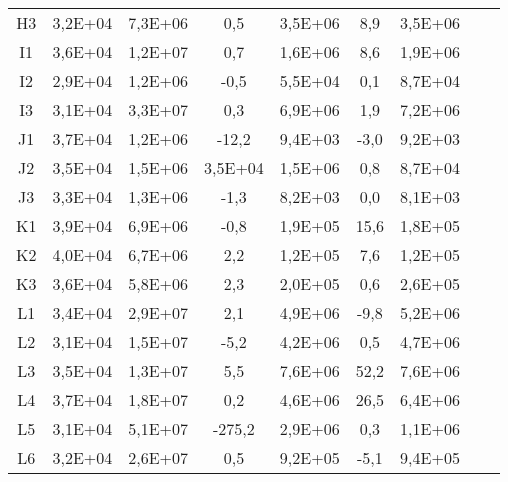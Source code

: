 \begin{center}
\begin{longtable}{ccccccccc}
H3    & 3,2E+04 & 7,3E+06 & 0,5   & 3,5E+06 & 8,9   & 3,5E+06 \\
I1    & 3,6E+04 & 1,2E+07 & 0,7   & 1,6E+06 & 8,6   & 1,9E+06 \\
I2    & 2,9E+04 & 1,2E+06 & -0,5  & 5,5E+04 & 0,1   & 8,7E+04 \\
I3    & 3,1E+04 & 3,3E+07 & 0,3   & 6,9E+06 & 1,9   & 7,2E+06 \\
J1    & 3,7E+04 & 1,2E+06 & -12,2 & 9,4E+03 & -3,0  & 9,2E+03 \\
J2    & 3,5E+04 & 1,5E+06 & 3,5E+04 & 1,5E+06 & 0,8   & 8,7E+04 \\
J3    & 3,3E+04 & 1,3E+06 & -1,3  & 8,2E+03 & 0,0   & 8,1E+03 \\
K1    & 3,9E+04 & 6,9E+06 & -0,8  & 1,9E+05 & 15,6  & 1,8E+05 \\
K2    & 4,0E+04 & 6,7E+06 & 2,2   & 1,2E+05 & 7,6   & 1,2E+05 \\
K3    & 3,6E+04 & 5,8E+06 & 2,3   & 2,0E+05 & 0,6   & 2,6E+05 \\
L1    & 3,4E+04 & 2,9E+07 & 2,1   & 4,9E+06 & -9,8  & 5,2E+06 \\
L2    & 3,1E+04 & 1,5E+07 & -5,2  & 4,2E+06 & 0,5   & 4,7E+06 \\
L3    & 3,5E+04 & 1,3E+07 & 5,5   & 7,6E+06 & 52,2  & 7,6E+06 \\
L4    & 3,7E+04 & 1,8E+07 & 0,2   & 4,6E+06 & 26,5  & 6,4E+06 \\
L5    & 3,1E+04 & 5,1E+07 & -275,2 & 2,9E+06 & 0,3   & 1,1E+06 \\
L6    & 3,2E+04 & 2,6E+07 & 0,5   & 9,2E+05 & -5,1  & 9,4E+05 \\
\end{longtable}
\end{center}

